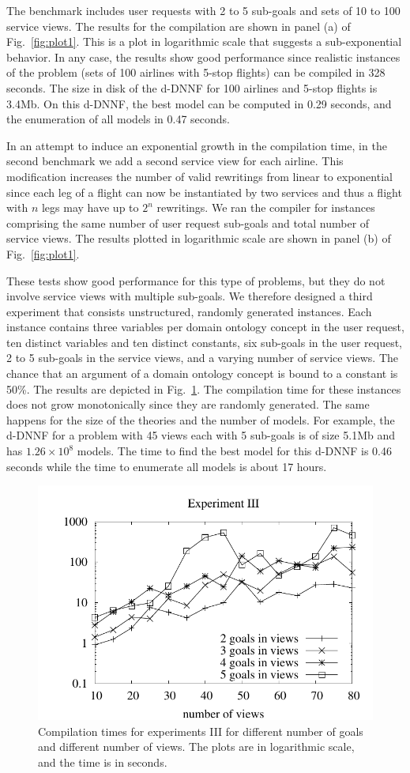 \documentclass{llncs}
\begin{document}
The benchmark includes user requests with 2 to 5 sub-goals and
sets of 10 to 100 service views. The results for the compilation are
shown in panel (a) of Fig.~\ref{fig:plot1}. This is a plot in logarithmic
scale that suggests a sub-exponential behavior. In any case, the results
show good performance since realistic instances of the problem (sets of 100
airlines with 5-stop flights) can be compiled in 328 seconds.
The size in disk of the d-DNNF for 100 airlines and 5-stop flights is 3.4Mb.
On this d-DNNF, the best model can be computed in 0.29 seconds,
and the enumeration of all models in 0.47 seconds.

In an attempt to induce an exponential growth in the compilation time,
in the second benchmark we add a second service view for each airline.
This modification increases the number of valid rewritings from linear
to exponential since each leg of a flight can now be instantiated by two
services and thus a flight with $n$ legs may have up to $2^n$
rewritings.
We ran the compiler for instances comprising the same number of user request
sub-goals and total number of service views. The results plotted in
logarithmic scale are shown in panel (b) of Fig.~\ref{fig:plot1}.

These tests show good performance for this type of problems, but they do not
involve service views with multiple sub-goals. We therefore designed a
third experiment that consists unstructured, randomly generated instances.
Each instance contains three variables per domain ontology concept in the user request, ten distinct
variables and ten distinct constants, six sub-goals in the user request,
2 to 5 sub-goals in the service views, and a varying number of service views.
The chance that an argument of a domain ontology concept is bound to a constant is 50\%.
The results are depicted in Fig.~\ref{fig:plot3}.
The compilation time for these instances does not grow monotonically
since they are randomly generated. The same happens for the size of
the theories and the number of models. For example, the d-DNNF for 
a problem with 45 views each with 5 sub-goals is of size 5.1Mb and has
$1.26\times 10^8$ models. The time to find the best model for
this d-DNNF is 0.46 seconds while the time to enumerate all models
is about 17 hours.

\begin{figure}[t]
\centering
\includegraphics[width=.6\textwidth]{plots/plot3}
\caption{Compilation times for experiments III for different number of goals
and different number of views. The plots are in logarithmic scale, and the time
is in seconds.}
\label{fig:plot3}
\end{figure}
\end{document}
